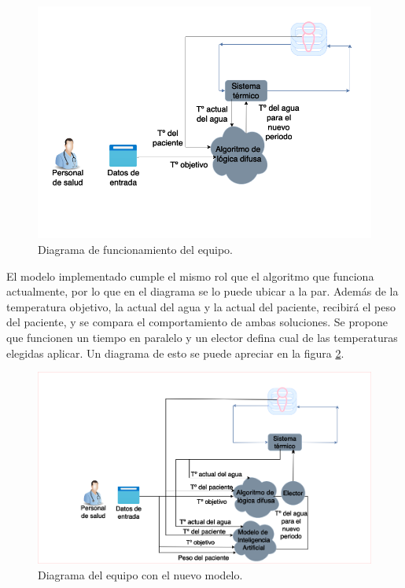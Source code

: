 \begin{figure}[htbp]
	\centering
	\includegraphics[width=1\textwidth]{./Figures/actual.png}
	\caption{Diagrama de funcionamiento del equipo.}
	\label{fig:actual-diagram}
\end{figure}

\vspace{1cm}

El modelo implementado cumple el mismo rol que el algoritmo que funciona actualmente, por lo que en el diagrama se lo puede ubicar a la par. Además de la temperatura objetivo, la actual del agua y la actual del paciente, recibirá el peso del paciente, y se compara el comportamiento de ambas soluciones. Se propone que funcionen un tiempo en paralelo y un elector defina cual de las temperaturas elegidas aplicar. Un diagrama de esto se puede apreciar en la figura \ref{fig:model-diagram}. 

\vspace{1cm}

\begin{figure}[htbp]
	\centering
	\includegraphics[width=1\textwidth]{./Figures/modelo.png}
	\caption{Diagrama del equipo con el nuevo modelo.}
	\label{fig:model-diagram}
\end{figure}

